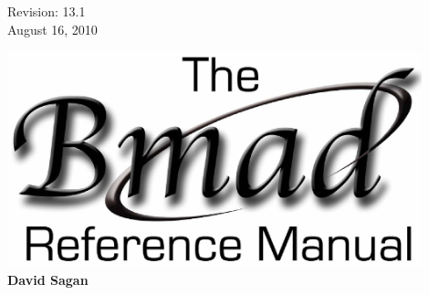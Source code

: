\thispagestyle{empty}

\begin{flushright}
\large
  Revision: 13.1 \\
  August 16, 2010 \\
\end{flushright}

\vfill

{
\begin{center}
\includegraphics[width=12cm]{bmad-ref-manual.eps} \\
\vskip 0.3in
\huge\bf David Sagan
\end{center}
}

\vfill
\break

